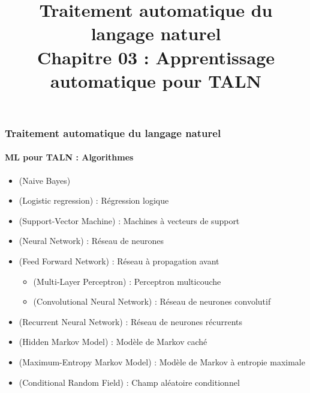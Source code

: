 \documentclass[xcolor=table]{beamer}
\title[TALN : 03- ML pour TALN]%
{Traitement automatique du langage naturel\\Chapitre 03 : Apprentissage automatique pour TALN}
\begin{document}
	
%		
%		
	
	\begin{frame}
		\frametitle{Traitement automatique du langage naturel}
		\framesubtitle{ML pour TALN : Algorithmes}
		
		\begin{itemize}
			\item {} (Naive Bayes)
			\item {} (Logistic regression) : Régression logique
			\item {} (Support-Vector Machine) : Machines à vecteurs de support 
			\item {} (Neural Network) : Réseau de neurones
			\item {} (Feed Forward Network) : Réseau à propagation avant
			\begin{itemize}
				\item {} (Multi-Layer Perceptron) : Perceptron multicouche
				\item {} (Convolutional Neural Network) : Réseau de neurones convolutif
			\end{itemize}
			\item {} (Recurrent Neural Network) : Réseau de neurones récurrents
			\item {} (Hidden Markov Model) : Modèle de Markov caché
			\item {} (Maximum-Entropy Markov Model) : Modèle de Markov à entropie maximale
			\item {} (Conditional Random Field) : Champ aléatoire conditionnel
		\end{itemize}
		
	\end{frame}
	
\end{document}
